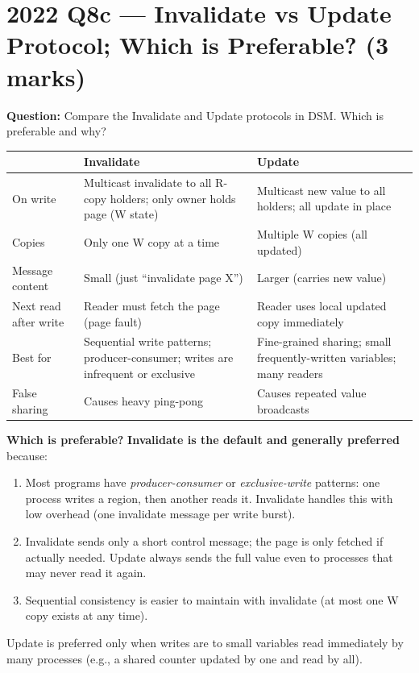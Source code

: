 \documentclass[12pt,a4paper]{article}
\begin{document}
\section{2022 Q8c --- Invalidate vs Update Protocol; Which is Preferable? (3 marks)}

\textbf{Question:} Compare the Invalidate and Update protocols in DSM. Which is preferable and why?

\begin{center}
\begin{tabular}{@{}p{3cm}p{5.5cm}p{5.5cm}@{}}
\toprule
 & \textbf{Invalidate} & \textbf{Update} \\
\midrule
On write & Multicast invalidate to all R-copy holders; only owner holds page (W state) & Multicast new value to all holders; all update in place \\
Copies & Only one W copy at a time & Multiple W copies (all updated) \\
Message content & Small (just ``invalidate page X'') & Larger (carries new value) \\
Next read after write & Reader must fetch the page (page fault) & Reader uses local updated copy immediately \\
Best for & Sequential write patterns; producer-consumer; writes are infrequent or exclusive & Fine-grained sharing; small frequently-written variables; many readers \\
False sharing & Causes heavy ping-pong & Causes repeated value broadcasts \\
\bottomrule
\end{tabular}
\end{center}

\textbf{Which is preferable?} \textbf{Invalidate is the default and generally preferred} because:
\begin{enumerate}[noitemsep]
  \item Most programs have \emph{producer-consumer} or \emph{exclusive-write} patterns: one process writes a region, then another reads it. Invalidate handles this with low overhead (one invalidate message per write burst).
  \item Invalidate sends only a short control message; the page is only fetched if actually needed. Update always sends the full value even to processes that may never read it again.
  \item Sequential consistency is easier to maintain with invalidate (at most one W copy exists at any time).
\end{enumerate}
Update is preferred only when writes are to small variables read immediately by many processes (e.g., a shared counter updated by one and read by all).
\end{document}
